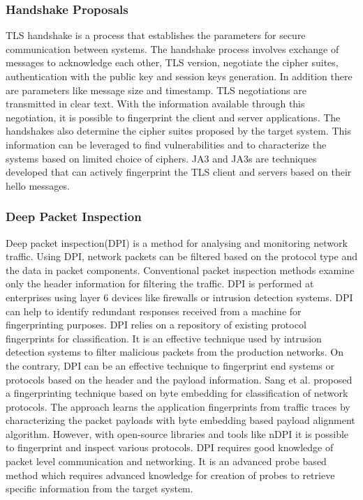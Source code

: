 \documentclass[letterpaper, 10 pt, conference]{ieeeconf}  %
\begin{document}
\subsubsection{Handshake Proposals}
TLS handshake is a process that establishes the parameters for secure communication between systems. The handshake process involves exchange of messages to acknowledge each other, TLS version,  negotiate the cipher suites, authentication with the public key and session keys generation. In addition there are parameters like message size and timestamp. TLS negotiations are transmitted in clear text. With the information available through this negotiation, it is possible to fingerprint the client and server applications.  The handshakes also determine the cipher suites proposed by the target system. This information can be leveraged to find vulnerabilities and to characterize the systems based on limited choice of ciphers. JA3 and JA3s\cite{JA3} are techniques developed that can actively fingerprint the TLS client and servers based on their hello messages.
\newline
\subsubsection{Deep Packet Inspection}
Deep packet inspection(DPI) is a method for analysing and monitoring network traffic. Using DPI, network packets can be filtered based on the protocol type and the data in packet components. Conventional packet inspection methods examine only the header information for filtering the traffic. DPI is performed at enterprises using layer 6 devices like firewalls or intrusion detection systems. DPI can help to identify redundant responses received from a machine for fingerprinting purposes. DPI relies on a repository of existing protocol fingerprints for classification. It is an effective technique used by intrusion detection systems to filter malicious packets from the production networks. On the contrary, DPI can be an effective technique to fingerprint end systems or protocols based on the header and the payload information. Sang et al.\cite{Sang} proposed a fingerprinting technique based on byte embedding for classification of network protocols. The approach learns the application fingerprints from traffic traces by characterizing the packet payloads with byte embedding based payload alignment algorithm. However, with open-source libraries and tools like nDPI\cite{nDPI} it is possible to fingerprint and inspect various protocols. DPI requires good knowledge of packet level communication and networking. It is an advanced probe based method which requires advanced knowledge for creation of probes to retrieve specific information from the target system. 
\newline
\end{document}
